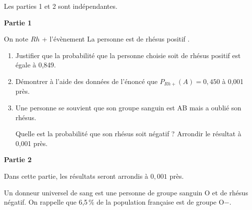 \documentclass[10pt]{article}
\begin{document}
\medskip

Les parties 1 et 2 sont indépendantes.


\textbf{Partie 1}

\medskip

On note $Rh$ + l'évènement \og La personne est de rhésus positif \fg.

\begin{enumerate}
\item Justifier que la probabilité que la personne choisie soit de rhésus positif est égale à 0,849.
\item Démontrer à l'aide des données de l'énoncé que $P_{Rh+}(A) = 0,450$ à 0,001 près.
\item Une personne se souvient que son groupe sanguin est AB mais a oublié son rhésus.

Quelle est la probabilité que son rhésus soit négatif ? Arrondir le résultat à 0,001 près.
\end{enumerate}

\bigskip

\textbf{Partie 2}

\medskip

Dans cette partie, les résultats seront arrondis à $0,001$ près.

\medskip

Un donneur universel de sang est une personne de groupe sanguin O et de rhésus négatif. On rappelle que 6,5\,\% de la population française est de groupe O$-$.

\medskip
\end{document}
